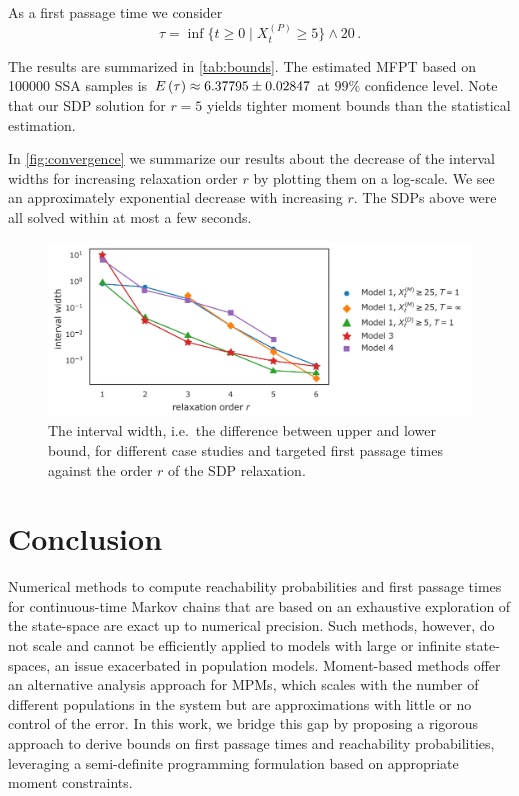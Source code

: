 As a first passage time we consider 
\[
	\tau=\inf\{t\geq 0\mid X_t^{(P)} \geq 5\}\land 20\,.
\]


The results are summarized in \autoref{tab:bounds}.
The estimated \ac{MFPT} based on \num{100000}
\ac{SSA} samples is ${E}\left(\tau\right)\approx 6.37795\pm0.02847$ at $99\%$ confidence level.
Note that our \ac{SDP} solution for $r=5$ yields tighter moment bounds than
the statistical estimation.%


In \autoref{fig:convergence} we summarize our results about the decrease of the interval widths for increasing relaxation order $r$ by plotting them on a log-scale.
We see an approximately exponential decrease with increasing $r$.
The \acp{SDP} above were all solved within at most a few seconds.
\begin{figure}[t]
    \centering
    \includegraphics[width=\textwidth]{gfx/convergence.pdf}
	\caption[\ac{MFPT} bound convergence]{The interval width, i.e.\ the difference between upper and lower bound,
    for different case studies and targeted first passage times against the order $r$
    of the \ac{SDP} relaxation.\label{fig:convergence}}
\end{figure}



\section{Conclusion}\label{sec:mfpt:conclusion}
Numerical methods to compute reachability probabilities and first passage times
for continuous-time Markov chains that are based on an exhaustive exploration of the state-space
are exact up to numerical precision. Such methods, however, do not scale and cannot be efficiently applied to models with large or infinite state-spaces,
an issue exacerbated in population models. Moment-based methods offer an alternative analysis approach
for \acp{MPM}, which scales with the number of different populations in the system
but are approximations with little or no control of the error.
In this work,
we bridge this gap by proposing a rigorous approach to derive bounds on first passage
times and reachability probabilities, leveraging a semi-definite programming formulation
based on appropriate moment constraints. 

